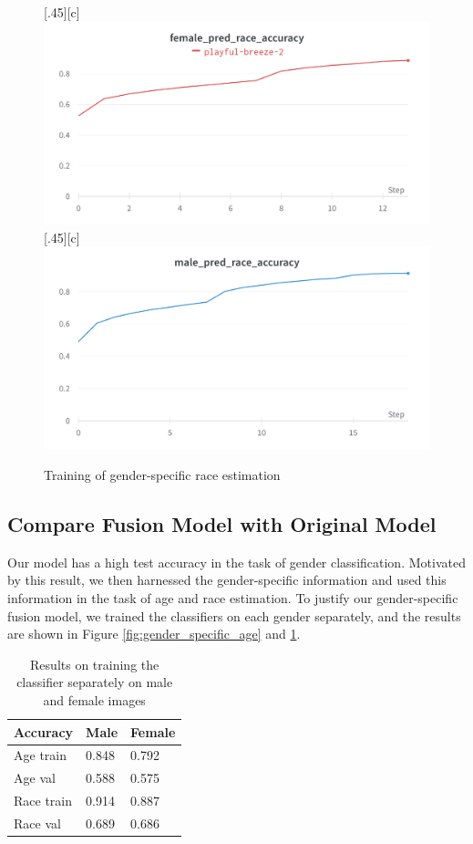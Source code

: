\documentclass[DIV=calc, paper=a4, fontsize=10pt, twocolumn]{article}
\begin{document}
	\begin{figure}[t]
		\centering
		\subcaptionbox{}[.45\linewidth][c]{%
			\includegraphics[width=\linewidth]{imgs/female_race.png}}\quad
		\subcaptionbox{}[.45\linewidth][c]{%
			\includegraphics[width=\linewidth]{imgs/male_race.png}}
		\caption{Training of gender-specific race estimation}
		\label{fig:gender_specific_race}
	\end{figure}

	\subsection{Compare Fusion Model with Original Model}
	
	Our model has a high test accuracy in the task of gender classification. Motivated by this result, we then harnessed the gender-specific information and used this information in the task of age and race estimation. To justify our gender-specific fusion model, we trained the classifiers on each gender separately, and the results are shown in Figure \ref{fig:gender_specific_age} and \ref{fig:gender_specific_race}.
	
	\begin{table}[H]
		\centering
		\begin{tabular}{|l|l|l|}
			\hline
			\textbf{Accuracy} & \textbf{Male} & \textbf{Female}  \\ \hline 
			Age	train	 & 0.848 & 0.792 \\ \hline
			Age val		 & 0.588 & 0.575 \\ \hline
			Race train   & 0.914 & 0.887 \\ \hline 
			Race val     & 0.689 & 0.686 \\ \hline
		\end{tabular}
		\caption{Results on training the classifier separately on male and female images}
	\end{table}
	
\end{document}
